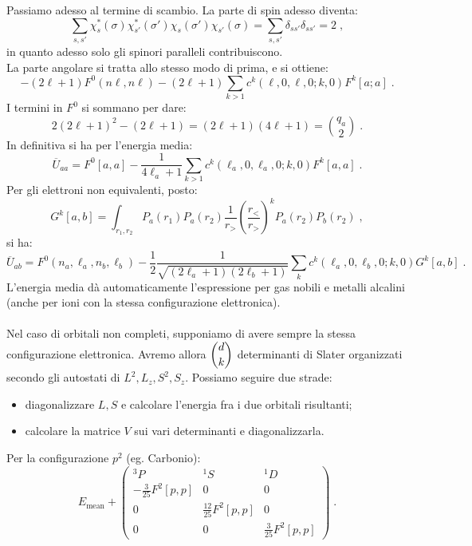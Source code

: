 \documentclass[12pt,a4paper]{report}
\theoremstyle{definition}
\numberwithin{equation}{section}
\begin{document}
Passiamo adesso al termine di scambio. La parte di spin adesso diventa:
\begin{equation}
\sum_{s,s'}\chi^*_s(\sigma)\chi^*_{s'}(\sigma')\chi_s(\sigma')\chi_{s'}(\sigma)=\sum_{s,s'}\delta_{ss'}\delta_{ss'}=2\;,
\end{equation}
in quanto adesso solo gli spinori paralleli contribuiscono. \\
La parte angolare si tratta allo stesso modo di prima, e si ottiene:
\begin{equation}
-(2\ell+1)F^0(n\ell,n\ell)-(2\ell+1)\sum_{k>1}c^k(\ell,0,\ell,0;k,0)F^k[a;a]\;.
\end{equation}
I termini in $F^0$ si sommano per dare:
\begin{equation}
2(2\ell+1)^2-(2\ell+1)=(2\ell+1)(4\ell+1)=\binom{q_a}{2}\;.
\end{equation}
In definitiva si ha per l'energia media:
\begin{equation}
\overline{U}_{aa}=F^0[a,a]-\frac{1}{4\ell_a+1}\sum_{k>1}c^k(\ell_a,0,\ell_a,0;k,0)F^k[a,a]\;.
\end{equation}
Per gli elettroni non equivalenti, posto:
\begin{equation}
G^k[a,b]=\int_{r_1,r_2}P_a(r_1)P_a(r_2)\frac{1}{r_>}\left(\frac{r_<}{r_>}\right)^kP_a(r_2)P_b(r_2)\;,
\end{equation}
si ha:
\begin{equation}
\overline{U}_{ab}=F^0(n_a,\ell_a,n_b,\ell_b)-\frac{1}{2}\frac{1}{\sqrt{(2\ell_a+1)(2\ell_b+1)}}\sum_k c^k(\ell_a,0,\ell_b,0;k,0)G^k[a,b]\;.
\end{equation}
L'energia media dà automaticamente l'espressione per gas nobili e metalli alcalini (anche per ioni con la stessa configurazione elettronica). \\
\\
Nel caso di orbitali non completi, supponiamo di avere sempre la stessa configurazione elettronica. Avremo allora $\dbinom{d}{k}$ determinanti di Slater organizzati secondo gli autostati di $L^2,L_z,S^2,S_z$. Possiamo seguire due strade:
\begin{itemize}
\item diagonalizzare $L,S$ e calcolare l'energia fra i due orbitali risultanti;
\item calcolare la matrice $V$ sui vari determinanti e diagonalizzarla.
\end{itemize}
Per la configurazione $p^2$ (eg. Carbonio):
\begin{equation}
E_{\mathrm{mean}}+\left(\begin{matrix}
{}^3P & {}^1S & {}^1D \\
-\frac{3}{25}F^2[p,p] & 0 & 0 \\
0 & \frac{12}{25}F^2[p,p] & 0 \\
0 & 0 & \frac{3}{25}F^2[p,p]
\end{matrix}\right)\;.
\end{equation}
\end{document}
